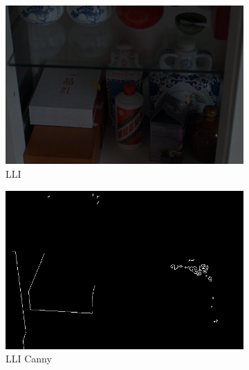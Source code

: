 \documentclass[a4paper]{ctexart}
\begin{document}
	\begin{figure}[htb]
		\centering
		\begin{subfigure}{0.19\textwidth}
			\includegraphics[width=\linewidth]{picture/LLIE/My Architecture/Edge Detection/low00044}
			\captionsetup{font=scriptsize}
			\caption{LLI}
			\label{fig: LLI}
		\end{subfigure}
		\begin{subfigure}{0.19\textwidth}
			\includegraphics[width=\linewidth]{picture/LLIE/My Architecture/Edge Detection/low00044_canny}				
			\captionsetup{font=scriptsize}
			\caption{LLI Canny}
			\label{fig: LLI_canny}	
		\end{subfigure}
		\begin{subfigure}{0.19\textwidth}

\end{subfigure}
\end{figure}
\end{document}
